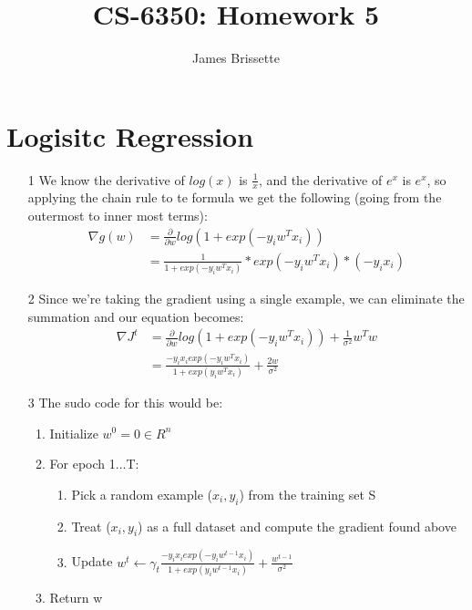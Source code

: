 \documentclass[11pt,a4paper]{article}
\author{James Brissette}
\title{CS-6350: Homework 5}
\begin{document}
	\maketitle
	
	\section{Logisitc Regression}
		\begin{itemize}
			\item [1] We know the derivative of $log(x)$ is $\frac{1}{x}$, and the derivative of $e^x$ is $e^x$, so applying the chain rule to te formula we get the following (going from the outermost to inner most terms):
			\begin{align*}
				\nabla g(w) &= \frac{\partial}{\partial w}log(1+exp(-y_i w^T x_i)) \\
				&= \frac{1}{1+exp(-y_iw^Tx_i)}*exp(-y_iw^Tx_i)*(-y_ix_i)
			\end{align*}
			\item [2] Since we're taking the gradient using a single example, we can eliminate the summation and our equation becomes:
			\begin{align*}
				\nabla J^t &= \frac{\partial}{\partial w}log(1+exp(-y_iw^Tx_i))+\frac{1}{\sigma^2}w^Tw \\
				&= \frac{-y_ix_iexp(-y_iw^Tx_i)}{1+exp(y_iw^Tx_i)}+\frac{2w}{\sigma^2}
			\end{align*}				
			\item [3] The sudo code for this would be:
				\begin{enumerate}
					\item Initialize $w^0=0 \in R^n$
					\item For epoch 1...T:
					\begin{enumerate}
						\item Pick a random example ($x_i,y_i$) from the training set S
						\item Treat ($x_i,y_i$) as a full dataset and compute the gradient found above
						\item Update $w^t \leftarrow \gamma_t\frac{-y_ix_iexp(-y_iw^{t-1}x_i)}{1+exp(y_iw^{t-1}x_i)}+\frac{w^{t-1}}{\sigma^2}$ 
					\end{enumerate}
					\item Return w
				\end{enumerate}
		\end{itemize}
	
\end{document}
